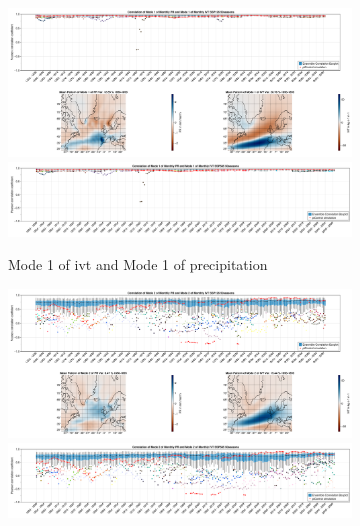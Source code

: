 \begin{figure}[!htbp]
\centering
  \begin{subfigure}[htb]{0.95\textwidth}
    \includegraphics[width=\textwidth]{figures/correlation_boxplot_pr_ivt_modes11_ssp126_50seasons.png}
    \includegraphics[width=\textwidth]{figures/correlation_boxplot_pr_ivt_modes11_ssp585_50seasons.png}
    \caption{Mode 1 of \ac{ivt} and Mode 1 of precipitation}
    \label{fig:cor pr ivt modes11}
\end{subfigure}
\hfill
  \begin{subfigure}[b]{0.95\textwidth}
    \includegraphics[width=\textwidth]{figures/correlation_boxplot_pr_ivt_modes22_ssp126_50seasons.png}
    \includegraphics[width=\textwidth]{figures/correlation_boxplot_pr_ivt_modes22_ssp585_50seasons.png}

\end{subfigure}
\end{figure}
